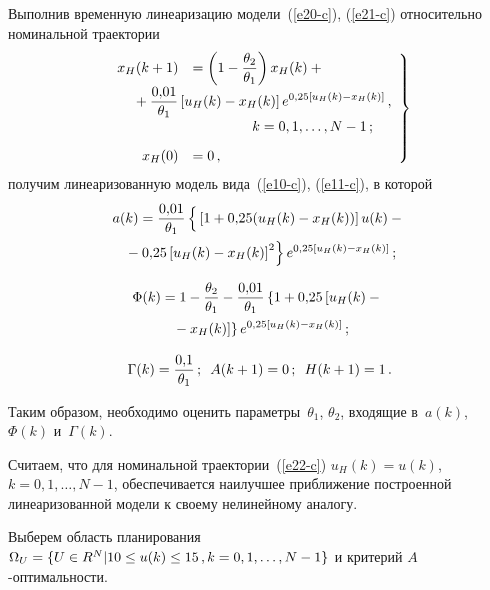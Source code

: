 \begin{multicols}{2}
  Выполнив временную линеаризацию модели~(\ref{e20-c}), (\ref{e21-c})
относительно номинальной траектории
\begin{equation}
\left.
\begin{array}{rl}
x_H(k+1)  &=\left(1-\fr{\theta_2}{\theta_1}\right) x_H(k)+{}\\[6pt]
&\hspace*{-15mm}{}+\fr{0{,}01}{\theta_1}\left[
u_H(k)-x_H(k)\right] e^{0{,}25[u_H(k)-x_H(k)]}\,,\\[6pt] 
&\hspace*{15mm}k=0,1, \ldots ,N-1\,;\\[9pt]
x_H(0)&=0\,,
\end{array}
\right \}
\label{e22-c}
\end{equation}
получим линеаризованную модель вида~(\ref{e10-c}), (\ref{e11-c}), в которой
\begin{multline*}
a(k)=\displaystyle\frac{\displaystyle 0{,}01\mathstrut}{\displaystyle \theta_1\mathstrut}\left \{
\vphantom{\left[ u_H(k)-x_H(k)\right]^2}
\vphantom{[x_H(k)]^2}
 \left[ 1+0{,}25(u_H(k)-x_H(k))\right] u(k)-
{}\right.\\
\left.{}-0{,}25\left[ u_H(k)-x_H(k)\right]^2\right \} e^{0{,}25 [u_H(k)-x_H(k)]}\,;
\end{multline*}

\vspace*{-12pt}

\noindent
\begin{multline*}
\Phi(k)=1-\displaystyle\frac{\displaystyle \theta_2\mathstrut}{\displaystyle \theta_1\mathstrut}-\displaystyle\frac{\displaystyle 0{,}01\mathstrut}{\displaystyle \theta_1\mathstrut}\left\{1+0{,}25\left[u_H(k)-{}\right.\right.\\
\left.\left.{}-x_H(k)\right]\right\} e^{0{,}25[u_H(k)-x_H(k)]}\,;
\end{multline*}

\vspace*{-6pt}

\noindent
\begin{equation*}
\Gamma(k) = \displaystyle\frac{\displaystyle 0{,}1\mathstrut}{\displaystyle \theta_1\mathstrut}\,; \enskip A(k+1)= 0\,;\enskip
H(k+1)=1\,.
\end{equation*}

  Таким образом, необходимо оценить па\-ра\-мет\-ры~$\theta_1$, $\theta_2$,
входящие в~$a(k)$, $\Phi(k)$ и~$\Gamma(k)$.

  Считаем, что для номинальной траектории~(\ref{e22-c}) $u_H(k)=u(k)$, $k=0,
1, \ldots ,N-1$, обеспечивается наилучшее приближение построенной
линеаризованной модели к своему нелинейному аналогу.

  Выберем область планирования
  $
  \Omega_U=\{U\hm \in R^N\vert 10\leq u(k)\leq 15\,, k=0,1, \ldots ,N-1\}$ и критерий
$A$-оп\-ти\-маль\-ности.


\end{multicols}
